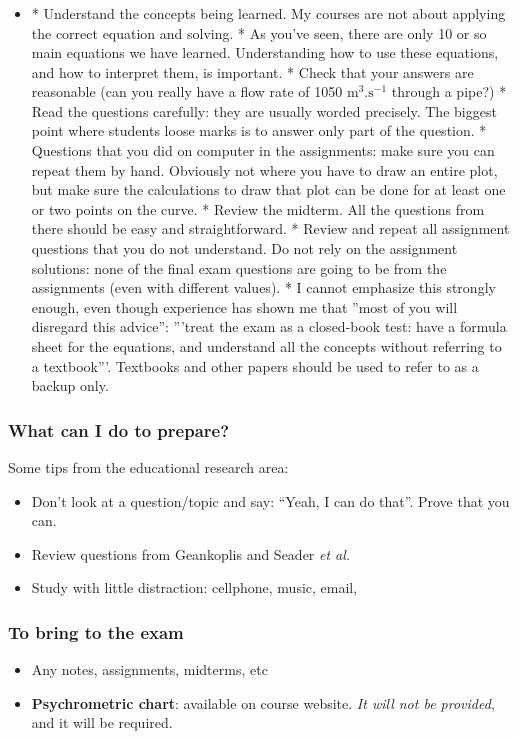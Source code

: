 \begin{frame}\frametitle{}
	\begin{itemize}
		\item	
		* Understand the concepts being learned. My courses are not about applying the correct equation and solving.
		* As you've seen, there are only 10 or so main equations we have learned. Understanding how to use these equations, and how to interpret them, is important.
		* Check that your answers are reasonable (can you really have a flow rate of 1050 \(\text{m}^3.\text{s}^{-1}\) through a pipe?)
		* Read the questions carefully: they are usually worded precisely. The biggest point where students loose marks is to answer only part of the question.
		* Questions that you did on computer in the assignments: make sure you can repeat them by hand. Obviously not where you have to draw an entire plot, but make sure the calculations to draw that plot can be done for at least one or two points on the curve.
		* Review the midterm. All the questions from there should be easy and straightforward.
		* Review and repeat all assignment questions that you do not understand. Do not rely on the assignment solutions: none of the final exam questions are going to be from the assignments (even with different values).
		* I cannot emphasize this strongly enough, even though experience has shown me that ''most of you will disregard this advice'': '''treat the exam as a closed-book test: have a formula sheet for the equations, and understand all the concepts without referring to a textbook'''.  Textbooks and other papers should be used to refer to as a backup only.

	\end{itemize}
\end{frame}

\begin{frame}\frametitle{What can I do to prepare?}
	Some tips from the educational research area:
	\begin{itemize}
		\item	Don't look at a question/topic and say: ``Yeah, I can do that''. Prove that you can.
		\item	Review questions from Geankoplis and Seader \emph{et al.}
		\item	Study with little distraction: cellphone, music, email, 
	\end{itemize}
\end{frame}

\begin{frame}\frametitle{To bring to the exam}
	\begin{itemize}
		\item	Any notes, assignments, midterms, etc
		\item	\textbf{Psychrometric chart}: available on course website. \emph{It will not be provided}, and it will be required.
	\end{itemize}
\end{frame}

